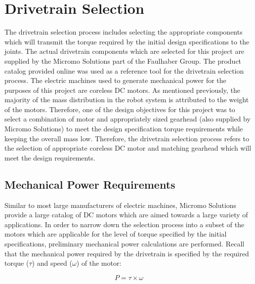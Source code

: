 

\section{Drivetrain Selection} %
\label{sec:drivetrain}
The drivetrain selection process includes selecting the appropriate components which will transmit the torque required by the initial design specifications to the joints. The actual drivetrain components which are selected for this project are supplied by the Micromo Solutions part of the Faulhaber Group. The product catalog provided online was used as a reference tool for the drivetrain selection process. The electric machines used to generate mechanical power for the purposes of this project are coreless DC motors. As mentioned previously, the majority of the mass distribution in the robot system is attributed to the weight of the motors. Therefore, one of the design objectives for this project was to select a combination of motor and appropriately sized gearhead (also supplied by Micromo Solutions) to meet the design specification torque requirements while keeping the overall mass low. Therefore, the drivetrain selection process refers to the selection of appropriate coreless DC motor and matching gearhead which will meet the design requirements. 


\subsection{Mechanical Power Requirements} %
\label{sub:mechanical_power_requirements}
Similar to most large manufacturers of electric machines, Micromo Solutions provide a large catalog of DC motors which are aimed towards a large variety of applications. In order to narrow down the selection process into a subset of the motors which are applicable for the level of torque specified by the initial specifications, preliminary mechanical power calculations are performed. Recall that the mechanical power required by the drivetrain is specified by the required torque ($\tau$) and speed ($\omega$) of the motor: 

\begin{equation}
	P = \tau \times \omega
\end{equation}

